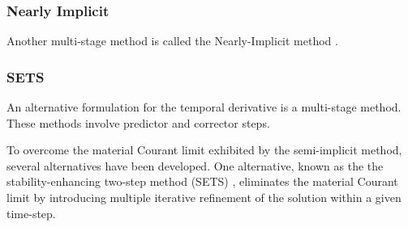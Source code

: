\subsubsection{Nearly Implicit}
\label{subsubsect:numerics_nearly_implicit}
Another multi-stage method is called the Nearly-Implicit method \cite{Trapp1986}.

\subsubsection{SETS}
\label{subsubsect:numerics_sets}
An alternative formulation for the temporal derivative is a multi-stage method.
These methods involve predictor and corrector steps.

To overcome the material Courant limit exhibited by the semi-implicit method, several alternatives have been developed.
One alternative, known as the the stability-enhancing two-step method (SETS) \cite{Mahaffy1982}, eliminates the material Courant limit by introducing multiple iterative refinement of the solution within a given time-step.


